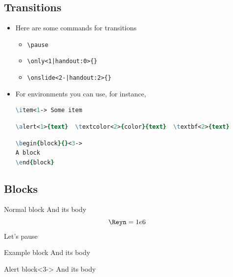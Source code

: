 \documentclass[aspectratio=169,11pt]{beamer}
\begin{document}
\subsection{Transitions}
\begin{frame}[fragile]{\insertsection}
    \begin{itemize}
        \item Here are some commands for transitions
        \begin{itemize}
            \item \verb|\pause|
            \item \verb!\only<1|handout:0>{}!
            \item \verb!\onslide<2-|handout:2>{}!
        \end{itemize}
        \item For environments you can use, for instance,
         \begin{lstlisting}[language=tcl,numbers=none]
\item<1-> Some item\end{lstlisting}
         \begin{lstlisting}[language=tcl,numbers=none]
\alert<1>{text}  \textcolor<2>{color}{text}  \textbf<2>{text}\end{lstlisting}
         \begin{lstlisting}[language=tcl,numbers=none]
\begin{block}{}<3->
A block
\end{block}\end{lstlisting}
    \end{itemize}
        
\end{frame}

\subsection{Blocks}
\begin{frame}{\insertsection}{\insertsubsection}  
    \begin{block}{Normal block}
    And its body
    $$ \Reyn= 1e6$$
    Let's pause 
    \end{block}
    \pause
    \begin{exampleblock}{Example block}
    And its body
    \end{exampleblock}
    \begin{alertblock}{Alert block}<3->
    And its body
    \end{alertblock}
\end{frame}
\end{document}
